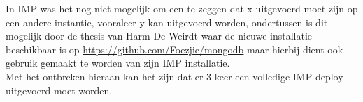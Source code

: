 \documentclass[]{article}
\begin{document}
In IMP was het nog niet mogelijk om een te zeggen dat x uitgevoerd moet zijn op een andere instantie, vooraleer y kan uitgevoerd worden, ondertussen is dit mogelijk door de thesis van Harm De Weirdt\cite{thesisHarm} waar de nieuwe installatie beschikbaar is op \url{https://github.com/Foezjie/mongodb} maar hierbij dient ook gebruik gemaakt te worden van zijn IMP installatie.  \\
Met het ontbreken hieraan kan het zijn dat er 3 keer een volledige IMP deploy uitgevoerd moet worden. 


\end{document}

